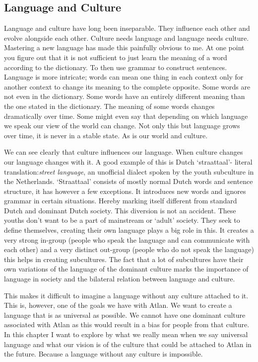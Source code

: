 \subsection{Language and Culture}

\noindent Language and culture have long been inseparable. They influence each other and evolve alongside each other. Culture needs language and language needs culture. Mastering a new language has made this painfully obvious to me. At one point you figure out that it is not sufficient to just learn the meaning of a word according to the dictionary. To then use grammar to construct sentences. Language is more intricate; words can mean one thing in each context only for another context to change its meaning to the complete opposite. Some words are not even in the dictionary. Some words have an entirely different meaning than the one stated in the dictionary. The meaning of some words changes dramatically over time. Some might even say that depending on which language we speak our view of the world can change. Not only this but language grows over time, it is never in a stable state. As is our world and culture.  

We can see clearly that culture influences our language. When culture changes our language changes with it. A good example of this is Dutch ‘straattaal’- literal translation:{\it street language}, an unofficial dialect spoken by the youth subculture in the Netherlands. ‘Straattaal’ consists of mostly normal Dutch words and sentence structure, it has however a few exceptions. It introduces new words and ignores grammar in certain situations. Hereby marking itself different from standard Dutch and dominant Dutch society. This diversion is not an accident. These youths don’t want to be a part of mainstream or ‘adult’ society. They seek to define themselves, creating their own language plays a big role in this. It creates a very strong in-group (people who speak the language and can communicate with each other) and a very distinct out-group (people who do not speak the language) this helps in creating subcultures. The fact that a lot of subcultures have their own variations of the language of the dominant culture marks the importance of language in society and the bilateral relation between language and culture.  

This makes it difficult to imagine a language without any culture attached to it. This is, however, one of the goals we have with Atlan. We want to create a language that is as universal as possible. We cannot have one dominant culture associated with Atlan as this would result in a bias for people from that culture. In this chapter I want to explore by what we really mean when we say universal language and what our vision is of the culture that could be attached to Atlan in the future. Because a language without any culture is impossible.  

